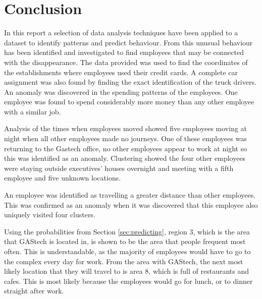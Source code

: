 \section{Conclusion}
\label{sec:conclusion}


In this report a selection of data analysis techniques have been applied to a dataset to identify patterns and predict behaviour. From this unusual behaviour has been identified and investigated to find employees that may be connected with the disappearance.  
The data provided was used to find the coordinates of the establishments where employees used their credit cards. A complete car assignment was also found by finding the exact identification of the truck drivers. \\

An anomaly was discovered in the spending patterns of the employees. One employee was found to spend considerably more money than any other employee with a similar job.

\noindent Analysis of the times when employees moved showed five employees moving at night when all other employees made no journeys. One of these employees was returning to the Gastech office, no other employees appear to work at night so this was identified as an anomaly. Clustering showed the four other employees were staying outside executives’ houses overnight and meeting with a fifth employee and five unknown locations. 

An employee was identified as travelling a greater distance than other employees. This was confirmed as an anomaly when it was discovered that this employee also uniquely visited four clusters.

Using the probabilities from Section \ref{sec:predicting}, region 3, which is the area that GAStech is located in, is shown to be the area that people frequent most often. This is understandable, as the majority of employees would have to go to the complex every day for work. From the area with GAStech, the next most likely location that they will travel to is area 8, which is full of restaurants and cafes. This is most likely because the employees would go for lunch, or to dinner straight after work. \\
